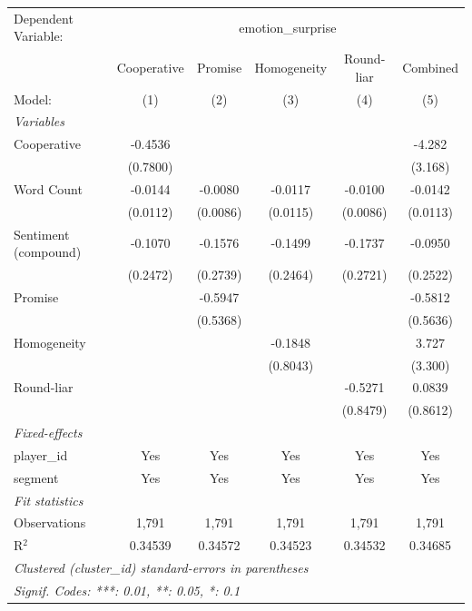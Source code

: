 
\begingroup
\centering
\begin{tabular}{lccccc}
   \tabularnewline \midrule \midrule
   Dependent Variable: & \multicolumn{5}{c}{emotion\_surprise}\\
                        & Cooperative & Promise  & Homogeneity & Round-liar & Combined \\   
   Model:               & (1)         & (2)      & (3)         & (4)        & (5)\\  
   \midrule
   \emph{Variables}\\
   Cooperative          & -0.4536     &          &             &            & -4.282\\   
                        & (0.7800)    &          &             &            & (3.168)\\   
   Word Count           & -0.0144     & -0.0080  & -0.0117     & -0.0100    & -0.0142\\   
                        & (0.0112)    & (0.0086) & (0.0115)    & (0.0086)   & (0.0113)\\   
   Sentiment (compound) & -0.1070     & -0.1576  & -0.1499     & -0.1737    & -0.0950\\   
                        & (0.2472)    & (0.2739) & (0.2464)    & (0.2721)   & (0.2522)\\   
   Promise              &             & -0.5947  &             &            & -0.5812\\   
                        &             & (0.5368) &             &            & (0.5636)\\   
   Homogeneity          &             &          & -0.1848     &            & 3.727\\   
                        &             &          & (0.8043)    &            & (3.300)\\   
   Round-liar           &             &          &             & -0.5271    & 0.0839\\   
                        &             &          &             & (0.8479)   & (0.8612)\\   
   \midrule
   \emph{Fixed-effects}\\
   player\_id           & Yes         & Yes      & Yes         & Yes        & Yes\\  
   segment              & Yes         & Yes      & Yes         & Yes        & Yes\\  
   \midrule
   \emph{Fit statistics}\\
   Observations         & 1,791       & 1,791    & 1,791       & 1,791      & 1,791\\  
   R$^2$                & 0.34539     & 0.34572  & 0.34523     & 0.34532    & 0.34685\\  
   \midrule \midrule
   \multicolumn{6}{l}{\emph{Clustered (cluster\_id) standard-errors in parentheses}}\\
   \multicolumn{6}{l}{\emph{Signif. Codes: ***: 0.01, **: 0.05, *: 0.1}}\\
\end{tabular}
\par\endgroup


